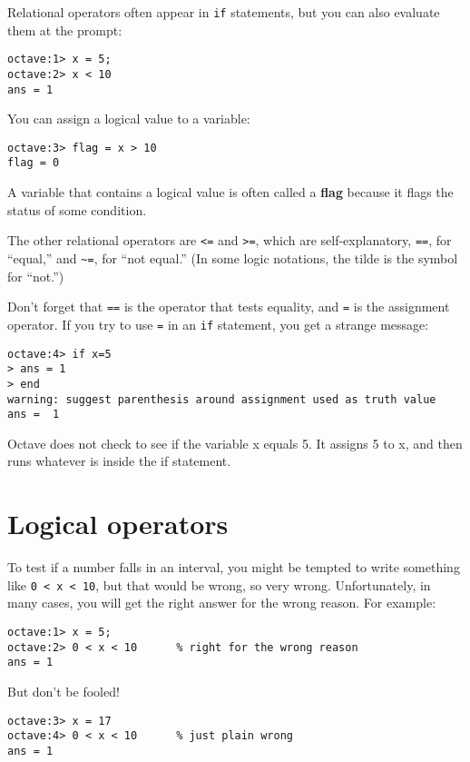 Relational operators often appear in {\tt if} statements, but you
can also evaluate them at the prompt:

\begin{verbatim}
octave:1> x = 5;
octave:2> x < 10
ans = 1
\end{verbatim}

You can assign a logical value to a variable:

\begin{verbatim}
octave:3> flag = x > 10
flag = 0
\end{verbatim}

A variable that contains a logical value is often called a {\bf flag}
because it flags the status of some condition.

The other relational operators are {\tt <=} and {\tt >=}, which are
self-explanatory, {\tt ==}, for ``equal,'' and 
\verb+~=+, for ``not equal.'' (In some logic notations, the tilde
is the symbol for ``not.'')

Don't forget that {\tt ==} is the operator that tests equality,
and {\tt =} is the assignment operator. If you try to use {\tt =} in
an {\tt if} statement, you get a strange message:

\begin{verbatim}
octave:4> if x=5
> ans = 1
> end
warning: suggest parenthesis around assignment used as truth value
ans =  1
\end{verbatim}

Octave does not check to see if the variable x equals 5. It assigns 5 to x, and
then runs whatever is inside the if statement.

\section{Logical operators}
\label{logop}

To test if a number falls in an interval, you might be
tempted to write something like {\tt 0 < x < 10}, but that
would be wrong, so very wrong. Unfortunately, in many cases,
you will get the right answer for the wrong reason. For
example:

\begin{verbatim}
octave:1> x = 5;
octave:2> 0 < x < 10      % right for the wrong reason
ans = 1
\end{verbatim}

But don't be fooled!

\begin{verbatim}
octave:3> x = 17
octave:4> 0 < x < 10      % just plain wrong
ans = 1
\end{verbatim}

